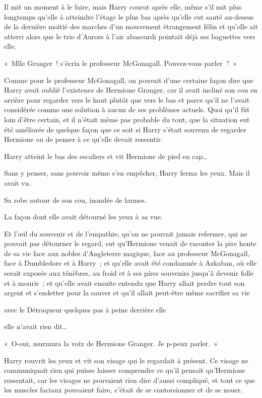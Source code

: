 Il mit un moment à le faire, mais Harry courut après elle, même s'il mit plus longtemps qu'elle à atteindre l'étage le plus bas après qu'elle eut sauté au-dessus de la dernière moitié des marches d'un mouvement étrangement félin et qu'elle ait atterri alors que le trio d'Aurors à l'air abasourdi pointait déjà ses baguettes vers elle.

«~Mlle Granger~! s'écria le professeur McGonagall.
Pouvez-vous parler~?~»

Comme pour le professeur McGonagall, on pouvait d'une certaine façon dire que Harry avait oublié l'existence de Hermione Granger, car il avait incliné son cou en arrière pour regarder vers le haut plutôt que vers le bas et parce qu'il ne l'avait considérée comme une solution à aucun de ses problèmes actuels.
Quoi qu'il fût loin d'être certain, et il n'était même pas probable du tout, que la situation eut été améliorée de quelque façon que ce soit si Harry s'était souvenu de regarder Hermione ou de penser à ce qu'elle devait ressentir.

Harry atteint le bas des escaliers et vit Hermione de pied en cap…

Sans y penser, sans pouvoir même s'en empêcher, Harry ferma les yeux.
Mais il avait vu.

Sa robe autour de son cou, inondée de larmes.

La façon dont elle avait détourné les yeux à \emph{sa} vue.

Et l'œil du souvenir et de l'empathie, qu'on ne pouvait jamais refermer, qui ne pouvait pas détourner le regard, sut qu'Hermione venait de raconter la pire honte de sa vie face aux nobles d'Angleterre magique, face au professeur McGonagall, face à Dumbledore et à Harry~; et qu'elle avait été condamnée à Azkaban, où elle serait exposée aux ténèbres, au froid et à ses pires souvenirs jusqu'à devenir folle et à mourir~; et qu'elle avait ensuite entendu que Harry allait perdre tout son argent et s'endetter pour la sauver et qu'il allait peut-être même sacrifier sa vie

avec le Détraqueur quelques pas à peine derrière elle

elle n'avait rien dit…

«~O-oui, murmura la voix de Hermione Granger.
Je p-peux parler.~»

Harry rouvrit les yeux et vit son visage qui le regardait à présent.
Ce visage ne communiquait rien qui puisse laisser comprendre ce qu'il pensait qu'Hermione ressentait, car les visages ne pouvaient rien dire d'aussi compliqué, et tout ce que les muscles faciaux pouvaient faire, c'était de se contorsionner et de se nouer.

